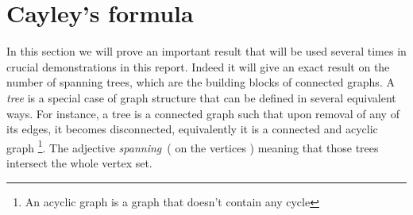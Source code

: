 \section{Cayley's formula}
In this section we will prove an important result that will be used several times in crucial demonstrations in this report. 
Indeed it will give an exact result on the number of spanning trees, which are the building blocks of connected graphs. 
A \emph{tree} is a special case of graph structure that can be defined in several equivalent ways. 
For instance, a tree is a connected graph such that upon removal of any of its edges, it becomes disconnected, equivalently it is a connected and acyclic graph
\footnote{An acyclic graph is a graph that doesn't contain any cycle}.
The adjective \emph{spanning} ( on the vertices ) meaning that those trees intersect the whole vertex set.

